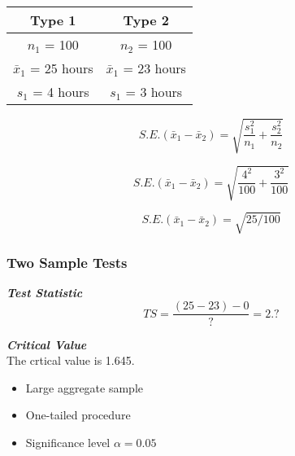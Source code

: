 \documentclass{beamer}
\begin{document}

\begin{frame}
\begin{center}
\begin{tabular}{|c||c|}
\hline 
Type 1 & Type 2 \\ \hline \hline
$n_1$ = 100 & $n_2$ = 100 \\ \hline
$\bar{x}_1$ = 25 hours & $\bar{x}_1$ = 23 hours \\ \hline
$s_1$ = 4 hours & $s_1$ = 3 hours \\ \hline
\end{tabular} 
\end{center}

\[ S.E.(\bar{x}_1 - \bar{x}_2)  = \sqrt{\frac{s^2_1}{n_1} + \frac{s^2_2}{n_2}}\]



\[ S.E.(\bar{x}_1 - \bar{x}_2)  = \sqrt{\frac{4^2}{100} + \frac{3^2}{100}}\]

\[ S.E.(\bar{x}_1 - \bar{x}_2)  =\sqrt{ 25/100}\]
\end{frame}

\begin{frame}
\frametitle{Two Sample Tests}
\noindent \textbf{\emph{Test Statistic}}
\[TS = \frac{(25-23) - 0}{?} = 2.?\]

\noindent \textbf{\emph{Critical Value}}\\
The crtical value is 1.645.
\begin{itemize}
\item Large aggregate sample
\item One-tailed procedure
\item Significance level $\alpha=0.05$
\end{itemize}

\end{frame}
\end{document}
